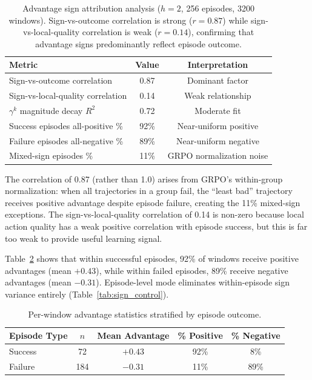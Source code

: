 \documentclass[11pt]{article}
\begin{document}
\begin{table}[h]
\centering
\caption{Advantage sign attribution analysis ($h=2$, 256 episodes, 3200 windows). Sign-vs-outcome correlation is strong ($r=0.87$) while sign-vs-local-quality correlation is weak ($r=0.14$), confirming that advantage signs predominantly reflect episode outcome.}
\label{tab:sign_attribution}
\begin{tabular}{lcc}
\toprule
Metric & Value & Interpretation \\
\midrule
Sign-vs-outcome correlation & 0.87 & Dominant factor \\
Sign-vs-local-quality correlation & 0.14 & Weak relationship \\
$\gamma^k$ magnitude decay $R^2$ & 0.72 & Moderate fit \\
Success episodes all-positive \% & 92\% & Near-uniform positive \\
Failure episodes all-negative \% & 89\% & Near-uniform negative \\
Mixed-sign episodes \% & 11\% & GRPO normalization noise \\
\bottomrule
\end{tabular}
\end{table}

The correlation of 0.87 (rather than 1.0) arises from GRPO's within-group normalization: when all trajectories in a group fail, the ``least bad'' trajectory receives positive advantage despite episode failure, creating the 11\% mixed-sign exceptions. The sign-vs-local-quality correlation of 0.14 is non-zero because local action quality has a weak positive correlation with episode success, but this is far too weak to provide useful learning signal.

Table~\ref{tab:advantage_stats} shows that within successful episodes, 92\% of windows receive positive advantages (mean $+0.43$), while within failed episodes, 89\% receive negative advantages (mean $-0.31$). Episode-level mode eliminates within-episode sign variance entirely (Table~\ref{tab:sign_control}).

\begin{table}[h]
\centering
\caption{Per-window advantage statistics stratified by episode outcome.}
\label{tab:advantage_stats}
\begin{tabular}{lcccc}
\toprule
Episode Type & $n$ & Mean Advantage & \% Positive & \% Negative \\
\midrule
Success & 72 & $+0.43$ & 92\% & 8\% \\
Failure & 184 & $-0.31$ & 11\% & 89\% \\
\bottomrule
\end{tabular}
\end{table}
\end{document}
